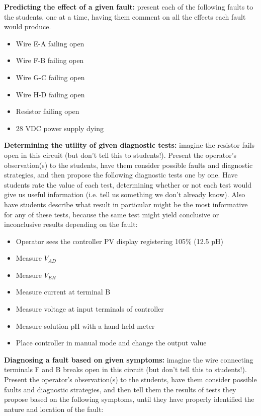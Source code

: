 \documentclass[12pt,a4paper]{article}
\begin{document}
\noindent
{\bf Predicting the effect of a given fault:} present each of the following faults to the students, one at a time, having them comment on all the effects each fault would produce.

\begin{itemize}
\item{} Wire E-A failing open
\item{} Wire F-B failing open
\item{} Wire G-C failing open
\item{} Wire H-D failing open
\item{} Resistor failing open
\item{} 28 VDC power supply dying
\end{itemize}


\vskip 10pt


\noindent
{\bf Determining the utility of given diagnostic tests:} imagine the resistor fails open in this circuit (but don't tell this to students!).  Present the operator's observation(s) to the students, have them consider possible faults and diagnostic strategies, and then propose the following diagnostic tests one by one.  Have students rate the value of each test, determining whether or not each test would give us useful information (i.e. tell us something we don't already know).  Also have students describe what result in particular might be the most informative for any of these tests, because the same test might yield conclusive or inconclusive results depending on the fault:

\begin{itemize}
\item{} Operator sees the controller PV display registering 105\% (12.5 pH)
\item{} Measure $V_{AD}$
\item{} Measure $V_{EH}$
\item{} Measure current at terminal B
\item{} Measure voltage at input terminals of controller
\item{} Measure solution pH with a hand-held meter
\item{} Place controller in manual mode and change the output value
\end{itemize}


\vskip 10pt


\noindent
{\bf Diagnosing a fault based on given symptoms:} imagine the wire connecting terminals F and B breaks open in this circuit (but don't tell this to students!).  Present the operator's observation(s) to the students, have them consider possible faults and diagnostic strategies, and then tell them the results of tests they propose based on the following symptoms, until they have properly identified the nature and location of the fault:
\end{document}

